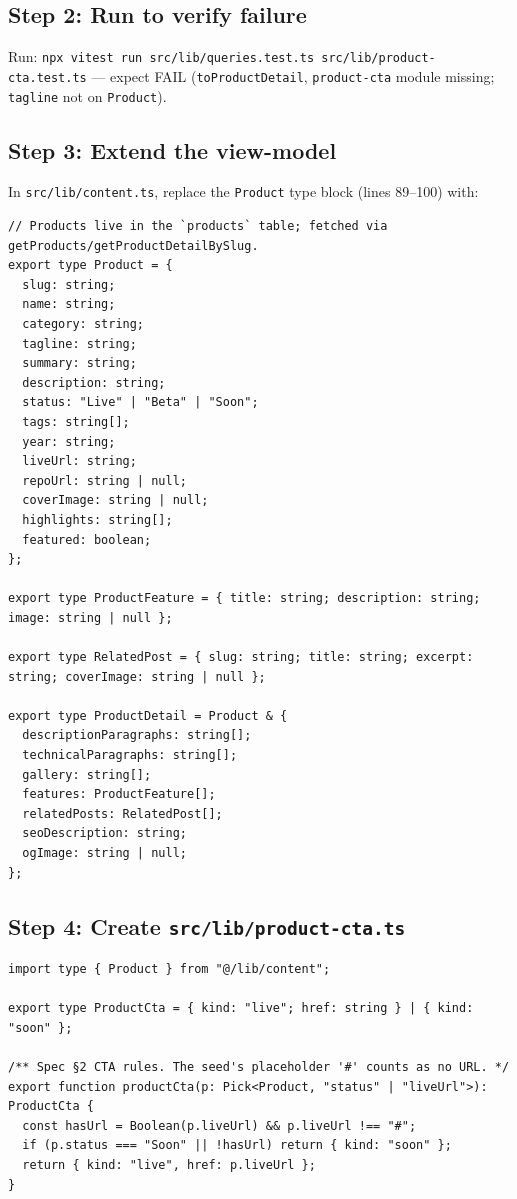 \documentclass[11pt,a4paper]{article}
\begin{document}
\subsection*{Step 2: Run to verify failure}

Run: \texttt{npx vitest run src/lib/queries.test.ts src/lib/product-cta.test.ts} --- expect FAIL
(\texttt{toProductDetail}, \texttt{product-cta} module missing; \texttt{tagline} not on
\texttt{Product}).

\subsection*{Step 3: Extend the view-model}

In \texttt{src/lib/content.ts}, replace the \texttt{Product} type block (lines 89--100) with:

\begin{lstlisting}
// Products live in the `products` table; fetched via getProducts/getProductDetailBySlug.
export type Product = {
  slug: string;
  name: string;
  category: string;
  tagline: string;
  summary: string;
  description: string;
  status: "Live" | "Beta" | "Soon";
  tags: string[];
  year: string;
  liveUrl: string;
  repoUrl: string | null;
  coverImage: string | null;
  highlights: string[];
  featured: boolean;
};

export type ProductFeature = { title: string; description: string; image: string | null };

export type RelatedPost = { slug: string; title: string; excerpt: string; coverImage: string | null };

export type ProductDetail = Product & {
  descriptionParagraphs: string[];
  technicalParagraphs: string[];
  gallery: string[];
  features: ProductFeature[];
  relatedPosts: RelatedPost[];
  seoDescription: string;
  ogImage: string | null;
};
\end{lstlisting}

\subsection*{Step 4: Create \texttt{src/lib/product-cta.ts}}

\begin{lstlisting}
import type { Product } from "@/lib/content";

export type ProductCta = { kind: "live"; href: string } | { kind: "soon" };

/** Spec §2 CTA rules. The seed's placeholder '#' counts as no URL. */
export function productCta(p: Pick<Product, "status" | "liveUrl">): ProductCta {
  const hasUrl = Boolean(p.liveUrl) && p.liveUrl !== "#";
  if (p.status === "Soon" || !hasUrl) return { kind: "soon" };
  return { kind: "live", href: p.liveUrl };
}
\end{lstlisting}
\end{document}
